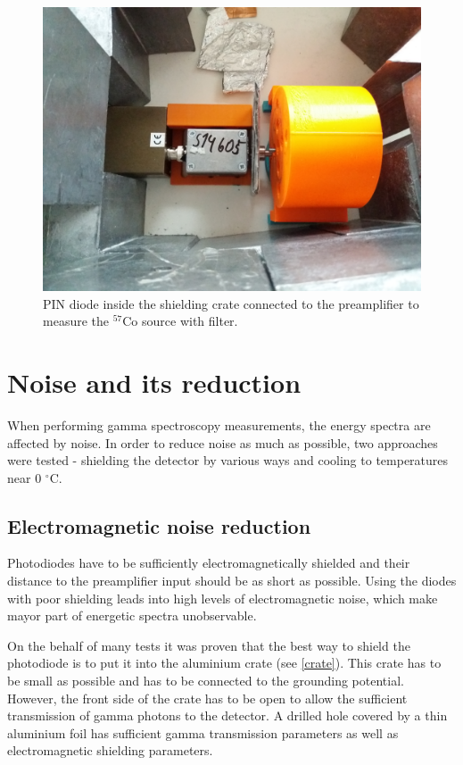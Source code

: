 \begin{figure}[H]
 \centering
 \includegraphics[scale=0.09, angle = 0]{./pictures/ORTECsetup.jpg}
 \caption{PIN diode inside the shielding crate connected to the preamplifier to measure the $^{57}$Co source with filter.}
 \label{setup}
 
\end{figure}


\section{Noise and its reduction}
When performing gamma spectroscopy measurements, the energy spectra are affected by noise. In order to reduce noise as much as possible, two approaches were tested - shielding the detector by various ways and cooling to temperatures near 0  $^\circ$C.
\subsection{Electromagnetic noise reduction}
Photodiodes have to be sufficiently electromagnetically shielded and their distance to the preamplifier input should be as short as possible. Using the diodes with poor shielding leads into high levels of electromagnetic noise, which make mayor part of energetic spectra unobservable.
\par
On the behalf of many tests it was proven that the best way to shield the photodiode is to put it into the aluminium crate (see \ref{crate}). This crate has to be small as possible and has to be connected to the grounding potential. However, the front side of the crate has to be open to allow the sufficient transmission of gamma photons to the detector. A drilled hole covered by a thin aluminium foil has sufficient gamma transmission parameters as well as electromagnetic shielding parameters.

